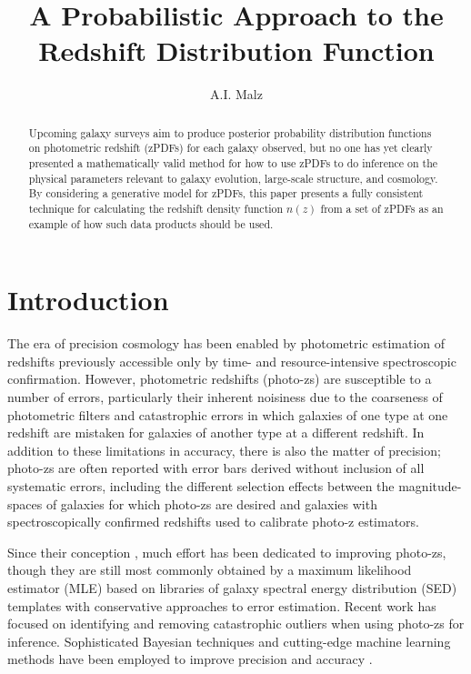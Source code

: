 \documentclass[preprint]{aastex}
\begin{document}
\title{A Probabilistic Approach to the Redshift Distribution Function}

\author{A.I. Malz}

\begin{abstract}
Upcoming galaxy surveys aim to produce posterior probability distribution functions on photometric redshift (zPDFs) for each galaxy observed, but no one has yet clearly presented a mathematically valid method for how to use zPDFs to do inference on the physical parameters relevant to galaxy evolution, large-scale structure, and cosmology.  By considering a generative model for zPDFs, this paper presents a fully consistent technique for calculating the redshift density function $n(z)$ from a set of zPDFs as an example of how such data products should be used.  
\end{abstract}


\section{Introduction}
\label{sec:intro}

The era of precision cosmology has been enabled by photometric estimation of redshifts previously accessible only by time- and resource-intensive spectroscopic confirmation.  However, photometric redshifts (photo-zs) are susceptible to a number of errors, particularly their inherent noisiness due to the coarseness of photometric filters and catastrophic errors in which galaxies of one type at one redshift are mistaken for galaxies of another type at a different redshift.  In addition to these limitations in accuracy, there is also the matter of precision; photo-zs are often reported with error bars derived without inclusion of all systematic errors, including the different selection effects between the magnitude-spaces of galaxies for which photo-zs are desired and galaxies with spectroscopically confirmed redshifts used to calibrate photo-z estimators.

Since their conception \citep{bau62}, much effort has been dedicated to improving photo-zs, though they are still most commonly obtained by a maximum likelihood estimator (MLE) based on libraries of galaxy spectral energy distribution (SED) templates with conservative approaches to error estimation.  Recent work has focused on identifying and removing catastrophic outliers when using photo-zs for inference.  \citep{gor13}  Sophisticated Bayesian techniques and cutting-edge machine learning methods have been employed to improve precision \citep{car10} and accuracy \citep{sad15}. 
\end{document}
